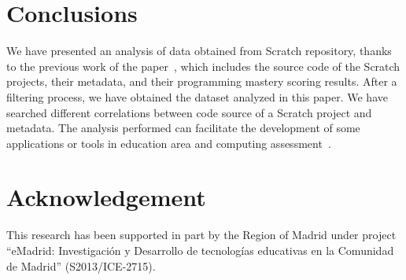 \documentclass[a4paper,twocolumn,10pt]{article}
\begin{document}
\section{Conclusions}
\label{sec:conclusions}

We have presented an analysis of data obtained from Scratch repository, thanks
to the previous work of the paper~\cite{aivaloglou2017dataset}, which includes the source code of the Scratch
projects, their metadata, and their programming mastery scoring results.
After a filtering process, we have obtained the dataset analyzed in this paper. We
have searched different correlations between code source of a Scratch project and metadata.
The analysis performed can facilitate the development of some applications or tools
in education area and computing assessment~\cite{robles2018ontools}.

\section*{Acknowledgement}

This research has been supported in part
by the Region of Madrid under project ``eMadrid:
Investigaci\'on y Desarrollo de tecnolog\'ias educativas en la
Comunidad de Madrid'' (S2013/ICE-2715).



 

\end{document}
